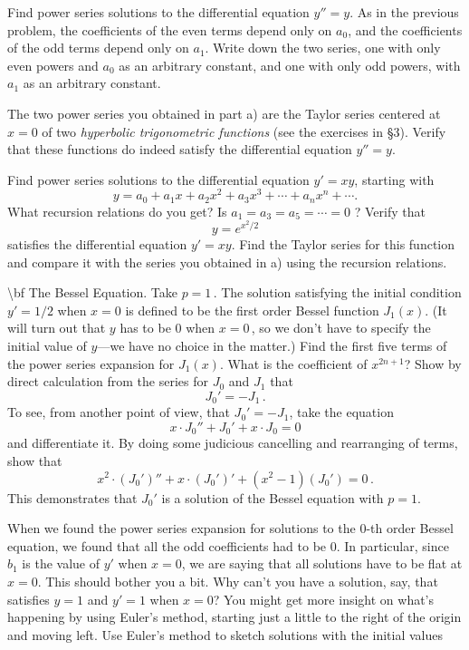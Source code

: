 {{{{\numa Find power series solutions to the differential equation $y''=y$.
As in the previous problem, the coefficients of the even terms depend
only on $a_0$, and the coefficients of the odd terms depend only on
$a_1$.  Write down the two series, one with only even powers and $a_0$ as
an arbitrary constant, and one with only odd powers, with $a_1$ as an
arbitrary constant.

\sub The two power series you obtained in part a) are the Taylor series
centered at $x=0$ of two {\em hyperbolic trigonometric functions\/} (see
the exercises in \S3).  Verify that these functions do indeed satisfy
the differential equation $y''=y$.

\numa  Find power series solutions to the differential equation $y'=xy$, starting with
\[
y = a_0 + a_1x + a_2 x^2 + a_3 x^3 + \cdots + a_n x^n + \cdots .
\]
What recursion relations do you get?  Is $a_1 = a_3 = a_5 = \cdots = 0$ ?
\sub  Verify that
\[
y = e^{x^2/2}
\]
satisfies the differential equation $y'=xy$.  Find the Taylor series for this function and compare it with the series you obtained in a) using the recursion relations.

\num  {\bf The Bessel Equation.} 
\sub  Take $p=1\,$.  The solution satisfying the initial condition $y' =1/2$ when $x=0$ is defined to be the first order Bessel function $J_1(x)$. (It will turn out that $y$ has to be 0 when $x=0$\,, so we don't have to specify the initial value of $y$---we have no choice in the matter.) Find the first five terms of the power series expansion for $J_1(x)$.  What is the coefficient of $x^{2n+1}$?
\sub Show by direct calculation from the series for $J_0$ and $J_1$ that
\[
J_0' = - J_1 \, .
\]
\sub To see, from another point of view, that $J_0' = - J_1$, take the equation
\[
x \cdot J_0'' + J_0' + x \cdot J_0 = 0
\]
and differentiate it.  By doing some judicious cancelling and rearranging of terms, show that
\[
x^2 \cdot (J_0')'' + x \cdot (J_0')' + (x^2 -1)(J_0') = 0 \, .
\]
This demonstrates that $J_0'$ is a solution of the Bessel equation with $p=1$.

\numa  When we found the power series expansion for solutions to the 0-th order Bessel equation, we found that all the odd coefficients had to be 0.  In particular, since $b_1$ is the value of $y'$ when $x=0$, we are saying that all solutions have to be flat at $x=0$.  This should bother you a bit.  Why can't you have a solution, say, that satisfies $y=1$ and $y'=1$ when $x=0$? 
\sub You might get more insight on what's happening by using Euler's method, starting just a little to the right of the origin and moving left.  Use Euler's method to sketch solutions with the initial values

}}}}
